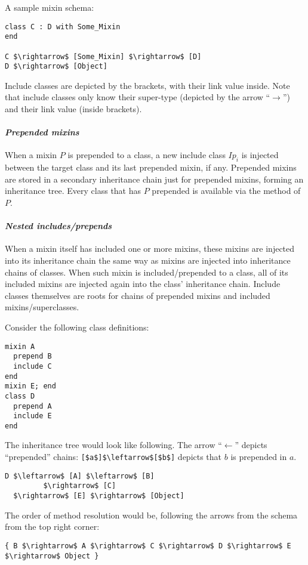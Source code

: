 \example A sample mixin schema:
\begin{lstlisting}
class C : D with Some_Mixin
end

C $\rightarrow$ [Some_Mixin] $\rightarrow$ [D]
D $\rightarrow$ [Object]
\end{lstlisting}
Include classes are depicted by the brackets, with their link value inside. Note that include classes only know their super-type (depicted by the arrow ``$\rightarrow$'') and their link value (inside brackets). 

\paragraph{\em Prepended mixins}
When a mixin $P$ is prepended to a class, a new include class $Ip_i$ is injected between the target class and its last prepended mixin, if any. Prepended mixins are stored in a secondary inheritance chain just for prepended mixins, forming an inheritance tree. Every class that has $P$ prepended is available via the  method of $P$. 

\paragraph{\em Nested includes/prepends}
When a mixin itself has included one or more mixins, these mixins are injected into its inheritance chain the same way as mixins are injected into inheritance chains of classes. When such mixin is included/prepended to a class, all of its included mixins are injected again into the class' inheritance chain. Include classes themselves are roots for chains of prepended mixins and included mixins/superclasses.

\example Consider the following class definitions:
\begin{lstlisting}
mixin A
  prepend B
  include C
end
mixin E; end
class D
  prepend A
  include E
end
\end{lstlisting}
The inheritance tree would look like following. The arrow ``$\leftarrow$'' depicts ``prepended'' chains: \lstinline![$a$]$\leftarrow$[$b$]! depicts that $b$ is prepended in $a$. 
\begin{lstlisting}
D $\leftarrow$ [A] $\leftarrow$ [B]
         $\rightarrow$ [C]
  $\rightarrow$ [E] $\rightarrow$ [Object]
\end{lstlisting}
The order of method resolution would be, following the arrows from the schema from the top right corner: 
\begin{lstlisting}
{ B $\rightarrow$ A $\rightarrow$ C $\rightarrow$ D $\rightarrow$ E $\rightarrow$ Object }
\end{lstlisting}

